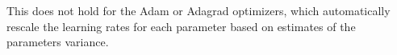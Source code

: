 This does not hold for the Adam \cite{kingma_adam:_2014} or Adagrad \cite{}
optimizers, which automatically rescale the learning rates for each parameter
based on estimates of the parameters variance.









